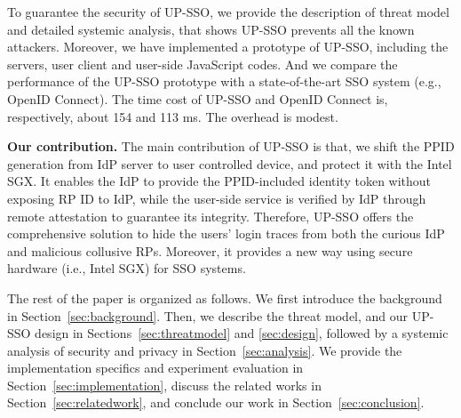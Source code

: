 To guarantee the security of UP-SSO, we provide the description of threat model and detailed systemic analysis, that shows UP-SSO prevents all the known attackers. Moreover, we have implemented a prototype of UP-SSO, including the servers, user client and user-side JavaScript codes. And we compare the performance of the UP-SSO prototype with a state-of-the-art SSO system (e.g., OpenID Connect). The time cost of UP-SSO and OpenID Connect is, respectively, about 154 and 113 ms. The overhead is modest.


\begin{comment}
We summarize our contributions as follows.
\begin{itemize}
\item We propose the comprehensive solution to hide the users' login traces from both the curious IdP and malicious collusive RPs for convenient SSO system.
\item We formally analyze the security of XXX and show that it guarantees the security, while the users' login traces are well protected.
\item We have implemented a prototype of XXX, and compare the performance of the UP-SSO prototype with the state-of-the-art SSO systems (e.g., OIDC), and demonstrate its efficiency.
\end{itemize}
\end{comment}

\vspace{3mm}\noindent\textbf{Our contribution. }The main contribution of UP-SSO is that, we shift the PPID generation from IdP server to user controlled device, and protect it with the Intel SGX. It enables the IdP to provide the PPID-included identity token without exposing RP ID to IdP, while the user-side service is verified by IdP through remote attestation to guarantee its integrity.  
Therefore, UP-SSO offers the comprehensive solution to hide the users' login traces from both the curious IdP and malicious collusive RPs. 
Moreover, it provides a new way using secure hardware (i.e., Intel SGX) for SSO systems.

The rest of the paper is organized as follows. We first introduce the background in Section~\ref{sec:background}. Then, we describe the threat model, and our UP-SSO design in Sections~\ref{sec:threatmodel} and \ref{sec:design}, followed by a systemic analysis of security and privacy in Section~\ref{sec:analysis}. We provide the implementation specifics and experiment evaluation in Section~\ref{sec:implementation}, discuss the related works in Section~\ref{sec:relatedwork}, and conclude our work in Section~\ref{sec:conclusion}.
